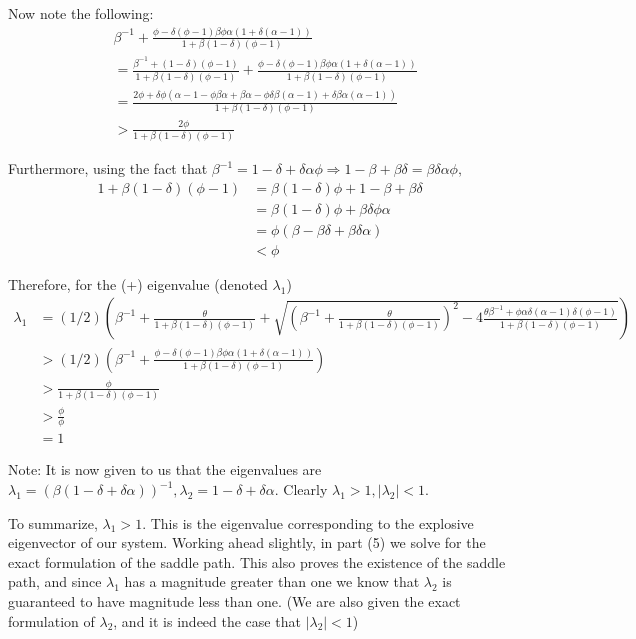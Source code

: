 \documentclass[11pt]{article} %
\begin{document}
Now note the following:%
\begin{align*}
&\beta^{-1} +\frac{\phi -  \delta(\phi - 1)\beta \phi \alpha (1 + \delta(\alpha - 1))}{1 + \beta(1-\delta) (\phi - 1)} \\&= \frac{\beta^{-1} + (1-\delta) (\phi - 1)}{1 + \beta(1-\delta) (\phi - 1)}  + \frac{\phi -  \delta(\phi - 1)\beta \phi \alpha (1 + \delta(\alpha - 1))}{1 + \beta(1-\delta) (\phi - 1)} \\
&= \frac{2\phi + \delta \phi (\alpha - 1 - \phi \beta \alpha + \beta \alpha - \phi \delta \beta (\alpha - 1) + \delta\beta\alpha(\alpha - 1))  }{1 + \beta(1-\delta) (\phi - 1)}\\
&> \frac{2\phi }{1 + \beta(1-\delta) (\phi - 1)}
\end{align*}

Furthermore, using the fact that $\beta^{-1} = 1-\delta + \delta\alpha \phi \Rightarrow 1-\beta+\beta\delta = \beta\delta\alpha\phi,$
\begin{align*}
1 + \beta(1-\delta)(\phi - 1) &= \beta(1-\delta)\phi + 1 - \beta + \beta\delta\\
&= \beta(1-\delta)\phi + \beta\delta\phi\alpha\\
&= \phi(\beta - \beta\delta + \beta\delta\alpha)\\
&<\phi
\end{align*}

Therefore, for the (+) eigenvalue (denoted $\lambda_1$)
\begin{align*}
\lambda_1 &= (1/2)\left( \beta^{-1} +\frac{\theta}{1 + \beta(1-\delta) (\phi - 1)} + \sqrt{\left( \beta^{-1} +\frac{\theta}{1 + \beta(1-\delta) (\phi - 1)}\right)^2 - 4\frac{\theta \beta^{-1} + \phi \alpha \delta (\alpha - 1)\delta(\phi - 1)}{1 + \beta(1-\delta) (\phi - 1)}} \right)\\
&>(1/2)\left(\beta^{-1} + \frac{\phi -  \delta(\phi - 1)\beta \phi \alpha (1 + \delta(\alpha - 1))}{1 + \beta(1-\delta) (\phi - 1)}\right)\\
&> \frac{\phi }{1 + \beta(1-\delta) (\phi - 1)}\\
&> \frac{\phi }{\phi}\\
&= 1
\end{align*}

Note: It is now given to us that the eigenvalues are $\lambda_1 = (\beta(1-\delta + \delta\alpha))^{-1}, \lambda_2 = 1-\delta + \delta \alpha.$ Clearly $\lambda_1>1,|\lambda_2|<1$.

To summarize, $\lambda_1 > 1.$ This is the eigenvalue corresponding to the explosive eigenvector of our system. Working ahead slightly, in part (5) we solve for the exact formulation of the saddle path. This also proves the existence of the saddle path, and since $\lambda_1$ has a magnitude greater than one we know that $\lambda_2$ is guaranteed to have magnitude less than one. (We are also given the exact formulation of $\lambda_2$, and it is indeed the case that $|\lambda_2|<1$)
\end{document}

